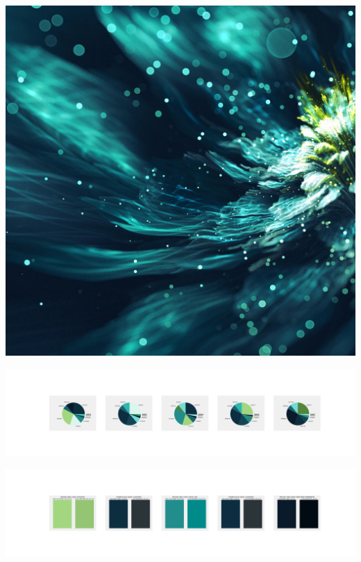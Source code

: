 \documentclass[11pt]{article}
\begin{document}
\begin{landscape}
    \begin{center}
    \includegraphics[width=\textwidth]{./nbimg/file (367).jpg}
    \end{center}

    \begin{center}
    \includegraphics[width=250mm]{./nbimg/pie-297.jpg}
    \end{center}

    \begin{center}
    \includegraphics[width=250mm]{./nbimg/peak-297.jpg}
    \end{center}
    


\end{landscape}
\end{document}
